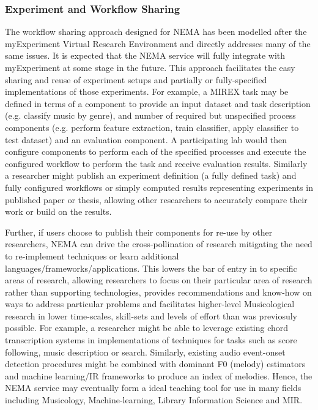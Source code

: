 \documentclass[conference]{IEEEtran}
\begin{document}
\subsubsection{Experiment and Workflow Sharing}
The workflow sharing approach designed for NEMA has been modelled after the myExperiment Virtual Research Environment \cite{de2007designing} and directly addresses many of the same issues. It is expected that the NEMA service will fully integrate with myExperiment at some stage in the future.  This approach facilitates the easy sharing and reuse of experiment setups and partially or fully-specified implementations of those experiments. For example, a MIREX task may be defined in terms of a component to provide an input dataset and task description (e.g. classify music by genre), and number of required but unspecified process components (e.g. perform feature extraction, train classifier, apply classifier to test dataset) and an evaluation component. A participating lab would then configure components to perform each of the specified processes and execute the configured workflow to perform the task and receive evaluation results.  Similarly a researcher might publish an experiment definition (a fully defined task) and fully configured workflows or simply computed results representing experiments in published paper or thesis, allowing other researchers to accurately compare their work or build on the results.

Further, if users choose to publish their components for re-use by other researchers, NEMA can drive the cross-pollination of research mitigating the need to re-implement techniques or learn additional languages/frameworks/applications. This lowers the bar of entry in to specific areas of research, allowing researchers to focus on their particular area of research rather than supporting technologies, provides recommendations and know-how on ways to address particular problems and facilitates higher-level Musicological research in lower time-scales, skill-sets and levels of effort than was previosuly possible.   
For example, a researcher might be able to leverage existing chord transcription systems in implementations of techniques for tasks such as score following, music description or search. Similarly, existing audio event-onset detection procedures might be combined with dominant F0 (melody) estimators and machine learning/IR frameworks to produce an index of melodies. 
Hence, the NEMA service may eventually form a ideal teaching tool for use in many fields including Musicology, Machine-learning, Library Information Science and MIR.
\end{document}
